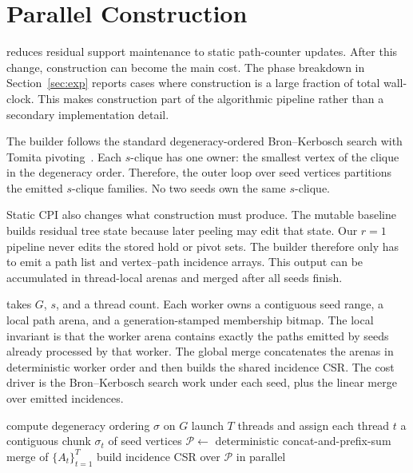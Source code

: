 \section{Parallel \cpi{} Construction}\label{sec:parabuild}

\peelH{} reduces residual support maintenance to static path-counter updates.
%
After this change, construction can become the main cost.
%
The phase breakdown in Section~\ref{sec:exp} reports cases where construction is a large fraction of total wall-clock.
%
This makes construction part of the algorithmic pipeline rather than a secondary implementation detail.

The \cpi{} builder follows the standard degeneracy-ordered Bron--Kerbosch search with Tomita pivoting~\cite{NuclearCD,BronKerbosch,eppstein,tomita}.
%
Each \(s\)-clique has one owner: the smallest vertex of the clique in the degeneracy order.
%
Therefore, the outer loop over seed vertices partitions the emitted \(s\)-clique families.
%
No two seeds own the same \(s\)-clique.

Static CPI also changes what construction must produce.
%
The mutable baseline builds residual tree state because later peeling may edit that state.
%
Our \(r=1\) pipeline never edits the stored hold or pivot sets.
%
The builder therefore only has to emit a path list and vertex--path incidence arrays.
%
This output can be accumulated in thread-local arenas and merged after all seeds finish.

\paraBuild{} takes \(G\), \(s\), and a thread count.
%
Each worker owns a contiguous seed range, a local path arena, and a generation-stamped membership bitmap.
%
The local invariant is that the worker arena contains exactly the paths emitted by seeds already processed by that worker.
%
The global merge concatenates the arenas in deterministic worker order and then builds the shared incidence CSR.
%
The cost driver is the Bron--Kerbosch search work under each seed, plus the linear merge over emitted incidences.

\begin{algorithm}[t]
\algfontsize
\caption{\paraBuild}
\label{alg:parabuild}

compute degeneracy ordering \(\sigma\) on \(G\)\;
launch \(T\) threads and assign each thread \(t\) a contiguous chunk \(\sigma_t\) of seed vertices\;
\(\mathcal{P}\gets\) deterministic concat-and-prefix-sum merge of \(\{A_t\}_{t=1}^T\)\;
build incidence CSR over \(\mathcal{P}\) in parallel\;
\end{algorithm}

